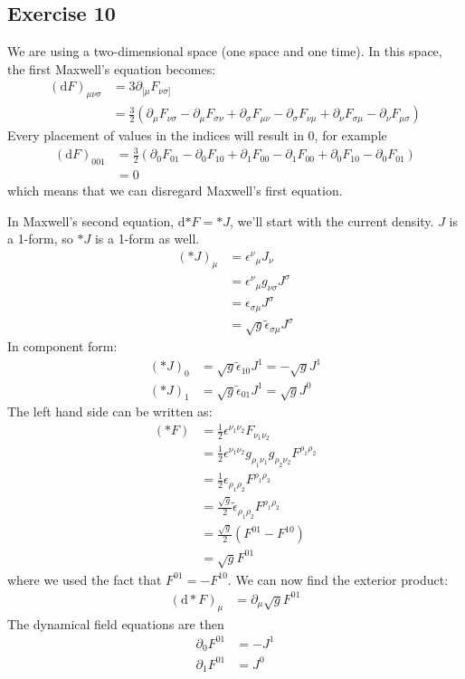 \subsection{Exercise 10}


We are using a two-dimensional space (one space and one time). In this space, the first Maxwell's equation becomes:
\begin{align}
    (\mathrm{d}F)_{\mu\nu\sigma} &= 3\partial_{[\mu}F_{\nu\sigma]} \\
    &= \frac{3}{2} \left( \partial_\mu F_{\nu\sigma} - \partial_\mu F_{\sigma\nu}
    +\partial_\sigma F_{\mu\nu} - \partial_\sigma F_{\nu\mu}
    +\partial_\nu F_{\sigma\mu} - \partial_\nu F_{\mu\sigma} \right)
\end{align}
Every placement of values in the indices will result in $0$, for example
\begin{align}
    (\mathrm{d}F)_{001} &= \frac{3}{2} \left(
      \partial_0 F_{01} - \partial_0 F_{10}
    + \partial_1 F_{00} - \partial_1 F_{00}
    + \partial_0 F_{10} - \partial_0 F_{01} \right) \\
    &= 0
\end{align}
which means that we can disregard Maxwell's first equation.

In Maxwell's second equation, $\mathrm{d}{*F}=*J$, we'll start with the current density. $J$ is a 1-form, so $*J$ is a 1-form as well.
\begin{align}
    (*J)_\mu &= \epsilon^\nu{_\mu}J_\nu \\
    &= \epsilon^\nu{_\mu} g_{\nu\sigma}J^\sigma \\
    &= \epsilon_{\sigma\mu} J^\sigma \\
    &= \sqrt{g}\tilde{\epsilon}_{\sigma\mu}J^\sigma
\end{align}
In component form:
\begin{align}
    (*J)_0 &= \sqrt{g}\tilde{\epsilon}_{10} J^1 = -\sqrt{g} J^1 \\
    (*J)_1 &= \sqrt{g}\tilde{\epsilon}_{01} J^1 = \sqrt{g} J^0
\end{align}
The left hand side can be written as:
\begin{align}
    (*F) &= \frac{1}{2} \epsilon^{\nu_1\nu_2} F_{\nu_1\nu_2} \\
    &=\frac{1}{2} \epsilon^{\nu_1\nu_2} g_{\rho_1\nu_1} g_{\rho_2\nu_2} F^{\rho_1\rho_2} \\
    &= \frac{1}{2} \epsilon_{\rho_1\rho_2}F^{\rho_1\rho_2} \\
    &= \frac{\sqrt{g}}{2} \tilde{\epsilon}_{\rho_1\rho_2}F^{\rho_1\rho_2} \\
    &= \frac{\sqrt{g}}{2} \left(F^{01}-F^{10}\right) \\
    &= \sqrt{g} F^{01}
\end{align}
where we used the fact that $F^{01}=-F^{10}$. We can now find the exterior product:
\begin{align}
    (\mathrm{d}*F)_\mu &= \partial_\mu \sqrt{g}F^{01}
\end{align}
The dynamical field equations are then
\begin{align}
    \partial_0 F^{01} &= -J^1 \\
    \partial_1 F^{01} &= J^0
\end{align}

